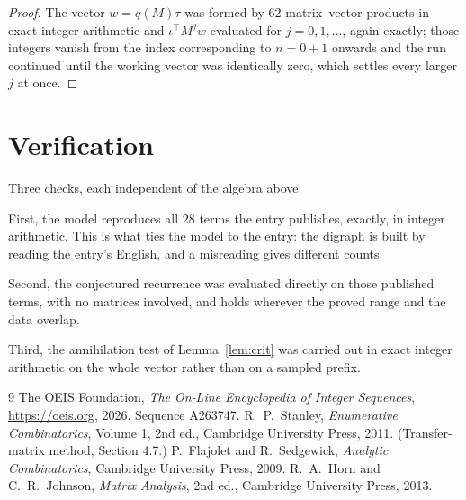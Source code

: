 \documentclass[11pt,a4paper]{article}
\theoremstyle{plain}
\theoremstyle{definition}
\begin{document}
\begin{proof}
The vector $w=q(M)\tau$ was formed by $62$ matrix--vector products in exact integer
arithmetic and $\iota^{\!\top}M^{j}w$ evaluated for $j=0,1,\dots$, again exactly; those
integers vanish from the index corresponding to $n=0+1$ onwards and the run continued
until the working vector was identically zero, which settles every larger $j$ at once.
\end{proof}

\section{Verification}

Three checks, each independent of the algebra above.

First, the model reproduces all $28$ terms the entry publishes, exactly, in integer
arithmetic. This is what ties the model to the entry: the digraph is built by reading the
entry's English, and a misreading gives different counts.

Second, the conjectured recurrence was evaluated directly on those published terms, with no
matrices involved, and holds wherever the proved range and the data overlap.

Third, the annihilation test of Lemma~\ref{lem:crit} was carried out in exact integer
arithmetic on the whole vector rather than on a sampled prefix.

\begin{thebibliography}{9}
 The OEIS Foundation, \emph{The On-Line Encyclopedia of Integer
Sequences}, \url{https://oeis.org}, 2026. Sequence A263747.
 R.~P.~Stanley, \emph{Enumerative Combinatorics}, Volume 1, 2nd ed.,
Cambridge University Press, 2011. (Transfer-matrix method, Section 4.7.)
 P.~Flajolet and R.~Sedgewick, \emph{Analytic Combinatorics}, Cambridge
University Press, 2009.
 R.~A.~Horn and C.~R.~Johnson, \emph{Matrix Analysis}, 2nd ed., Cambridge
University Press, 2013.
\end{thebibliography}
\end{document}
